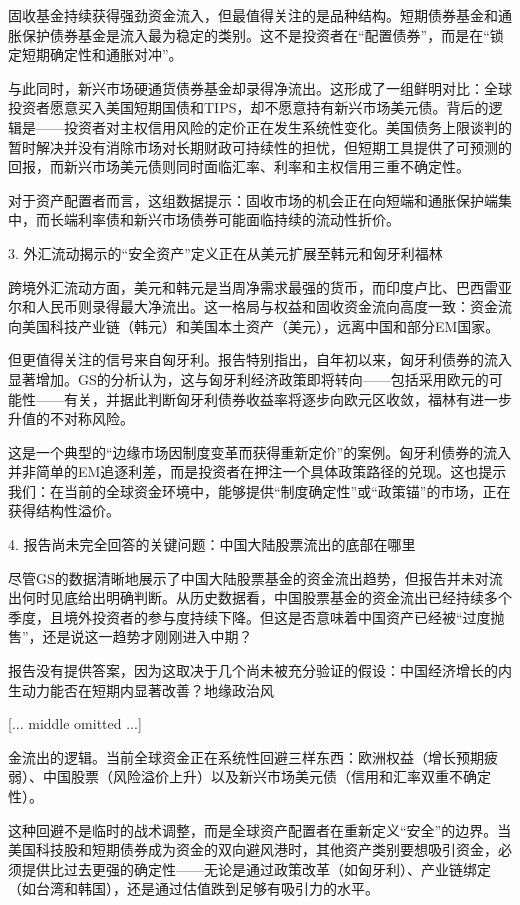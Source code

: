 \documentclass[11pt]{ctexart}
\begin{document}
固收基金持续获得强劲资金流入，但最值得关注的是品种结构。短期债券基金和通胀保护债券基金是流入最为稳定的类别。这不是投资者在“配置债券”，而是在“锁定短期确定性和通胀对冲”。

与此同时，新兴市场硬通货债券基金却录得净流出。这形成了一组鲜明对比：全球投资者愿意买入美国短期国债和TIPS，却不愿意持有新兴市场美元债。背后的逻辑是——投资者对主权信用风险的定价正在发生系统性变化。美国债务上限谈判的暂时解决并没有消除市场对长期财政可持续性的担忧，但短期工具提供了可预测的回报，而新兴市场美元债则同时面临汇率、利率和主权信用三重不确定性。

对于资产配置者而言，这组数据提示：固收市场的机会正在向短端和通胀保护端集中，而长端利率债和新兴市场债券可能面临持续的流动性折价。

3. 外汇流动揭示的“安全资产”定义正在从美元扩展至韩元和匈牙利福林

跨境外汇流动方面，美元和韩元是当周净需求最强的货币，而印度卢比、巴西雷亚尔和人民币则录得最大净流出。这一格局与权益和固收资金流向高度一致：资金流向美国科技产业链（韩元）和美国本土资产（美元），远离中国和部分EM国家。

但更值得关注的信号来自匈牙利。报告特别指出，自年初以来，匈牙利债券的流入显著增加。GS的分析认为，这与匈牙利经济政策即将转向——包括采用欧元的可能性——有关，并据此判断匈牙利债券收益率将逐步向欧元区收敛，福林有进一步升值的不对称风险。

这是一个典型的“边缘市场因制度变革而获得重新定价”的案例。匈牙利债券的流入并非简单的EM追逐利差，而是投资者在押注一个具体政策路径的兑现。这也提示我们：在当前的全球资金环境中，能够提供“制度确定性”或“政策锚”的市场，正在获得结构性溢价。

4. 报告尚未完全回答的关键问题：中国大陆股票流出的底部在哪里

尽管GS的数据清晰地展示了中国大陆股票基金的资金流出趋势，但报告并未对流出何时见底给出明确判断。从历史数据看，中国股票基金的资金流出已经持续多个季度，且境外投资者的参与度持续下降。但这是否意味着中国资产已经被“过度抛售”，还是说这一趋势才刚刚进入中期？

报告没有提供答案，因为这取决于几个尚未被充分验证的假设：中国经济增长的内生动力能否在短期内显著改善？地缘政治风

[... middle omitted ...]

金流出的逻辑。当前全球资金正在系统性回避三样东西：欧洲权益（增长预期疲弱）、中国股票（风险溢价上升）以及新兴市场美元债（信用和汇率双重不确定性）。

这种回避不是临时的战术调整，而是全球资产配置者在重新定义“安全”的边界。当美国科技股和短期债券成为资金的双向避风港时，其他资产类别要想吸引资金，必须提供比过去更强的确定性——无论是通过政策改革（如匈牙利）、产业链绑定（如台湾和韩国），还是通过估值跌到足够有吸引力的水平。
\end{document}
